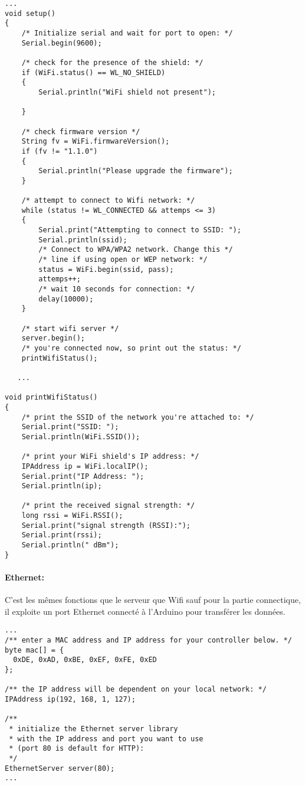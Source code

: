 \begin{lstlisting}
...
void setup()
{
    /* Initialize serial and wait for port to open: */
    Serial.begin(9600);

    /* check for the presence of the shield: */
    if (WiFi.status() == WL_NO_SHIELD)
    {
        Serial.println("WiFi shield not present");

    }

    /* check firmware version */
    String fv = WiFi.firmwareVersion();
    if (fv != "1.1.0")
    {
        Serial.println("Please upgrade the firmware");
    }
      
    /* attempt to connect to Wifi network: */
    while (status != WL_CONNECTED && attemps <= 3)
    {
        Serial.print("Attempting to connect to SSID: ");
        Serial.println(ssid);
        /* Connect to WPA/WPA2 network. Change this */
        /* line if using open or WEP network: */
        status = WiFi.begin(ssid, pass);
        attemps++;
        /* wait 10 seconds for connection: */
        delay(10000);
    }
    
    /* start wifi server */
    server.begin();
    /* you're connected now, so print out the status: */
    printWifiStatus();
        
   ...
   
void printWifiStatus()
{
    /* print the SSID of the network you're attached to: */
    Serial.print("SSID: ");
    Serial.println(WiFi.SSID());

    /* print your WiFi shield's IP address: */
    IPAddress ip = WiFi.localIP();
    Serial.print("IP Address: ");
    Serial.println(ip);

    /* print the received signal strength: */
    long rssi = WiFi.RSSI();
    Serial.print("signal strength (RSSI):");
    Serial.print(rssi);
    Serial.println(" dBm");
}

\end{lstlisting}

\paragraph{Ethernet:}
C'est les mêmes fonctions que le serveur que Wifi sauf pour la partie connectique, il exploite un port Ethernet connecté à l'Arduino pour transférer les données.
\begin{lstlisting}
...
/** enter a MAC address and IP address for your controller below. */
byte mac[] = {
  0xDE, 0xAD, 0xBE, 0xEF, 0xFE, 0xED
};

/** the IP address will be dependent on your local network: */
IPAddress ip(192, 168, 1, 127);

/** 
 * initialize the Ethernet server library
 * with the IP address and port you want to use
 * (port 80 is default for HTTP):
 */
EthernetServer server(80);
...

\end{lstlisting}


